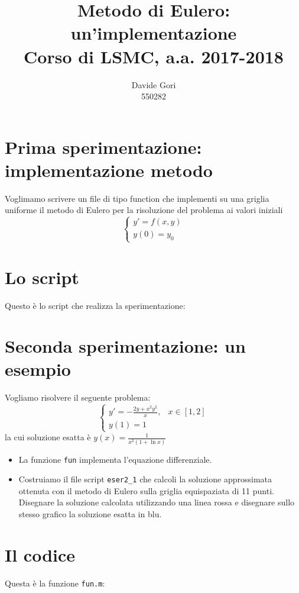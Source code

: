 \documentclass{article}
\title{Metodo di Eulero: un'implementazione\\
	Corso di LSMC, a.a. 2017-2018}
\author{Davide Gori\\
	550282}
\begin{document}
	\maketitle
	\section{Prima sperimentazione: implementazione metodo}
	Voglimamo scrivere un file di tipo function che implementi su una griglia uniforme il metodo di Eulero per la risoluzione del problema ai valori iniziali
	\begin{equation}
	\begin{cases}
	y'=f(x,y) \\
	y(0)=y_0
	\end{cases}
	\end{equation}
	\section{Lo script}
	Questo è lo script che realizza la sperimentazione:
	
	
	
	\section{Seconda sperimentazione: un esempio}
	Vogliamo risolvere il seguente problema:
	\begin{equation}
	\begin{cases}
	y'=- \frac{2y+x^2 y^2}{x}, & x \in [1, 2] \\
	y(1)=1
	\end{cases}
	\end{equation}
	la cui soluzione esatta è $y(x)=\frac{1}{x^2 (1+\ln{x})}$
	\begin{itemize}
	\item La funzione {\tt fun} implementa l'equazione differenziale.
	\item Costruiamo il file script {\tt eser2\_1} che calcoli la soluzione approssimata ottenuta con il metodo di Eulero sulla griglia equispaziata di 11 punti. Disegnare la soluzione calcolata utilizzando una linea rossa e disegnare sullo stesso grafico la soluzione esatta in blu.
	\end{itemize}

	\section{Il codice}
	Questa è la funzione {\tt fun.m}:
	
\end{document}
